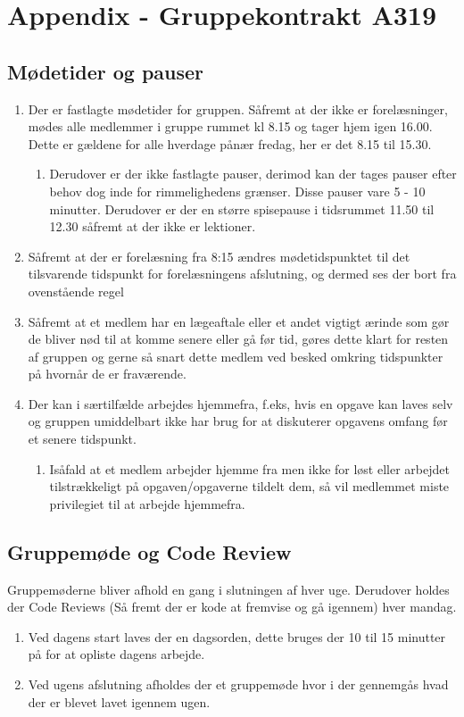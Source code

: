 \chapter{Appendix - Gruppekontrakt A319}\label{[CHAPTER] Appendix}
\section{Mødetider og pauser}
\begin{enumerate}
\item Der er fastlagte mødetider for gruppen. Såfremt at der ikke er forelæsninger, mødes alle medlemmer i gruppe rummet kl 8.15 og tager hjem igen 16.00. Dette er gældene for alle hverdage pånær fredag, her er det 8.15 til 15.30.
\begin{enumerate}
\item Derudover er der ikke fastlagte pauser, derimod kan der tages pauser efter behov dog inde for rimmelighedens grænser. Disse pauser vare 5 - 10 minutter. Derudover er der en større spisepause i tidsrummet 11.50 til 12.30 såfremt at der ikke er lektioner.
\end{enumerate}
\item Såfremt at der er forelæsning fra 8:15 ændres mødetidspunktet til det tilsvarende tidspunkt for forelæsningens afslutning, og dermed ses der bort fra ovenstående regel
\item Såfremt at et medlem har en lægeaftale eller et andet vigtigt ærinde som gør de bliver nød til at komme senere eller gå før tid, gøres dette klart for resten af gruppen og gerne så snart dette medlem ved besked omkring tidspunkter på hvornår de er fraværende.
\item Der kan i særtilfælde arbejdes hjemmefra, f.eks, hvis en opgave kan laves selv og gruppen umiddelbart ikke har brug for at diskuterer opgavens omfang før et senere tidspunkt.
\begin{enumerate}
\item Isåfald at et medlem arbejder hjemme fra men ikke for løst eller arbejdet tilstrækkeligt på opgaven/opgaverne tildelt dem, så vil medlemmet miste privilegiet til at arbejde hjemmefra.
\end{enumerate}
\end{enumerate}

\section{Gruppemøde og Code Review}
Gruppemøderne bliver afhold en gang i slutningen af hver uge. Derudover holdes der Code Reviews (Så fremt der er kode at fremvise og gå igennem) hver mandag.
\begin{enumerate}
\item Ved dagens start laves der en dagsorden, dette bruges der 10 til 15 minutter på for at opliste dagens arbejde.
\item Ved ugens afslutning afholdes der et gruppemøde hvor i der gennemgås hvad der er blevet lavet igennem ugen.
\end{enumerate}

